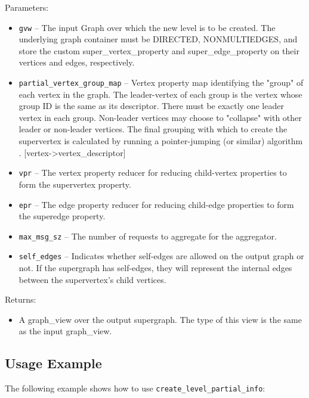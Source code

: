 Parameters:
\begin{itemize}
\item
\texttt{gvw} --
The input Graph over which the new level is to be created. The underlying graph container must be DIRECTED, NONMULTIEDGES, and store the custom super\_vertex\_property and super\_edge\_property on their vertices and edges, respectively.
\item
\texttt{partial\_vertex\_group\_map} --
Vertex property map identifying the "group" of each vertex in the graph. The leader-vertex of each group is the vertex whose group ID is the same as its descriptor. There must be exactly one leader vertex in each group. Non-leader vertices may choose to "collapse" with other leader or non-leader vertices. The final grouping with which to create the supervertex is calculated by running a pointer-jumping (or similar) algorithm . [vertex->vertex\_descriptor]
\item
\texttt{vpr} --
The vertex property reducer for reducing child-vertex properties to form the supervertex property.
\item
\texttt{epr} --
The edge property reducer for reducing child-edge properties to form the superedge property.
\item
\texttt{max\_msg\_sz} --
The number of requests to aggregate for the aggregator.
\item
\texttt{self\_edges} --
Indicates whether self-edges are allowed on the output graph or not. If the supergraph has self-edges, they will represent the internal edges between the supervertex's child vertices.
\end{itemize}

Returns:
\begin{itemize}
\item
A graph\_view over the output supergraph. The type of this view is the same as the input graph\_view. 
\end{itemize}

\subsection{Usage Example} \label{sec-create-level-part-alg-use}

The following example shows how to use 
\texttt{create\_level\_partial\_info}:


